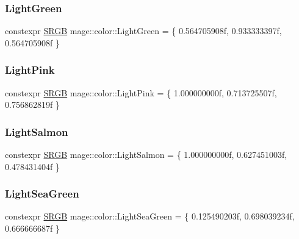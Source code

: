 \hypertarget{namespacemage_1_1color_a876dd8dc8b28b60bcb9b088d7eb52256}{}\label{namespacemage_1_1color_a876dd8dc8b28b60bcb9b088d7eb52256} 
\subsubsection{\texorpdfstring{Light\+Green}{LightGreen}}
{\footnotesize\ttfamily constexpr \hyperlink{structmage_1_1_s_r_g_b}{S\+R\+GB} mage\+::color\+::\+Light\+Green = \{ 0.\+564705908f, 0.\+933333397f, 0.\+564705908f \}}

\hypertarget{namespacemage_1_1color_afd7de46670d9e2497b5ec6beac856ce9}{}\label{namespacemage_1_1color_afd7de46670d9e2497b5ec6beac856ce9} 
\subsubsection{\texorpdfstring{Light\+Pink}{LightPink}}
{\footnotesize\ttfamily constexpr \hyperlink{structmage_1_1_s_r_g_b}{S\+R\+GB} mage\+::color\+::\+Light\+Pink = \{ 1.\+000000000f, 0.\+713725507f, 0.\+756862819f \}}

\hypertarget{namespacemage_1_1color_ac5f1a50cde3527ea8b79516b754253c1}{}\label{namespacemage_1_1color_ac5f1a50cde3527ea8b79516b754253c1} 
\subsubsection{\texorpdfstring{Light\+Salmon}{LightSalmon}}
{\footnotesize\ttfamily constexpr \hyperlink{structmage_1_1_s_r_g_b}{S\+R\+GB} mage\+::color\+::\+Light\+Salmon = \{ 1.\+000000000f, 0.\+627451003f, 0.\+478431404f \}}

\hypertarget{namespacemage_1_1color_ac664ce1e7cd3721eefcc51c6d7da0869}{}\label{namespacemage_1_1color_ac664ce1e7cd3721eefcc51c6d7da0869} 
\subsubsection{\texorpdfstring{Light\+Sea\+Green}{LightSeaGreen}}
{\footnotesize\ttfamily constexpr \hyperlink{structmage_1_1_s_r_g_b}{S\+R\+GB} mage\+::color\+::\+Light\+Sea\+Green = \{ 0.\+125490203f, 0.\+698039234f, 0.\+666666687f \}}

